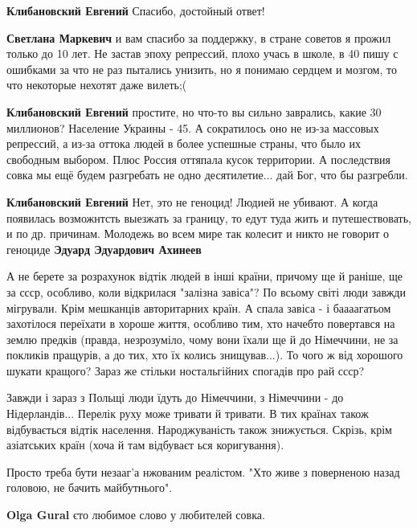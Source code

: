 \begin{itemize}
\begin{itemize}
\begin{itemize} %
\textbf{Клибановский Евгений} Спасибо, достойный ответ!

\textbf{Светлана Маркевич} и вам спасибо за поддержку, в стране советов я прожил только до 10 лет. Не застав эпоху репрессий, плохо учась в школе, в 40 пишу с ошибками за что не раз пытались унизить, но я понимаю сердцем и мозгом, то что некоторые нехотят даже вилеть;(

\textbf{Клибановский Евгений} простите, но что-то вы сильно заврались, какие 30 миллионов? Население Украины - 45. А сократилось оно не из-за массовых репрессий, а из-за оттока людей в более успешные страны, что было их свободным выбором. Плюс Россия оттяпала кусок территории. А последствия совка мы ещё будем разгребать не одно десятилетие... дай Бог, что бы разгребли.

\textbf{Клибановский Евгений} Нет, это не геноцид! Людией не убивают. А когда появилась возможнтсть выезжать за границу, то едут туда жить и путешествовать, и по др. причинам. Молодежь во всем мире так колесит и никто не говорит о геноциде
\textbf{Эдуард Эдуардович Ахинеев}

А не берете за розрахунок відтік людей в інші країни, причому ще й раніше, ще
за ссср, особливо, коли відкрилася "залізна завіса"? По всьому світі люди
завжди мігрували. Крім мешканців авторитарних країн. А спала завіса - і
баааагатьом захотілося переїхати в хороше життя, особливо тим, хто начебто
повертався на землю предків (правда, незрозуміло, чому вони їхали ще й до
Німеччини, не за покликів пращурів, а до тих, хто їх колись знищував...). То
чого ж від хорошого шукати кращого? Зараз же стільки ностальгійних спогадів про
рай ссср?

Завжди і зараз з Польщі люди їдуть до Німеччини, з Німеччини - до
Нідерландів... Перелік руху може тривати й тривати. В тих країнах також
відбувається відтік населення. Народжуваність також знижується. Скрізь, крім
азіатських країн (хоча й там відбуваєт ься коригування).

Просто треба бути незааг'а нжованим реалістом. "Хто живе з поверненою назад
головою, не бачить майбутнього".

\textbf{Olga Gural} єто любимое слово у любителей совка.
\end{itemize} %



\end{itemize}
\end{itemize}
